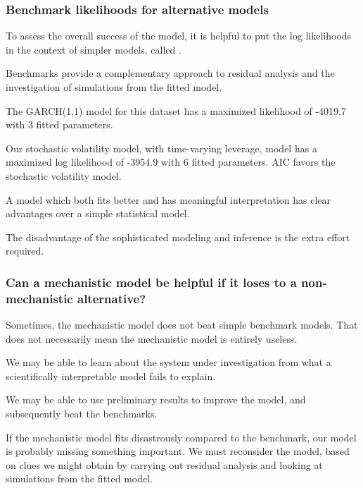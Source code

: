 \documentclass{beamer}\usepackage[]{graphicx}\usepackage[]{color}
\begin{document}
\begin{frame}[fragile]

\frametitle{Benchmark likelihoods for alternative models}

\bi

\item To assess the overall success of the model, it is helpful to put the log likelihoods in the context of simpler models, called .

\item Benchmarks provide a complementary approach to residual analysis and the investigation of simulations from the fitted model.





\item The GARCH(1,1) model for this dataset has a maximized likelihood of -4019.7 with 3 fitted parameters.

\item Our stochastic volatility model, with time-varying leverage, model has a maximized log likelihood of -3954.9 with 6 fitted parameters.  AIC favors the stochastic volatility model.

\item A model which both fits better and has meaningful interpretation has clear advantages over a simple statistical model. 

\item The disadvantage of the sophisticated modeling and inference is the extra effort required.

\ei

\end{frame}

\begin{frame}[fragile]

\frametitle{Can a mechanistic model be helpful if it loses to a non-mechanistic alternative?}

\bi

\item Sometimes, the mechanistic model does not beat simple benchmark models. That does not necessarily mean the mechanistic model is entirely useless. 

\item We may be able to learn about the system under investigation from what a scientifically interpretable model fails to explain.

\item We may be able to use preliminary results to improve the model, and subsequently beat the benchmarks.

\item If the mechanistic model fits disastrously compared to the benchmark, our model is probably missing something important. We must reconsider the model, based on clues we might obtain by carrying out residual analysis and looking at simulations from the fitted model.

\ei

\end{frame}
\end{document}
